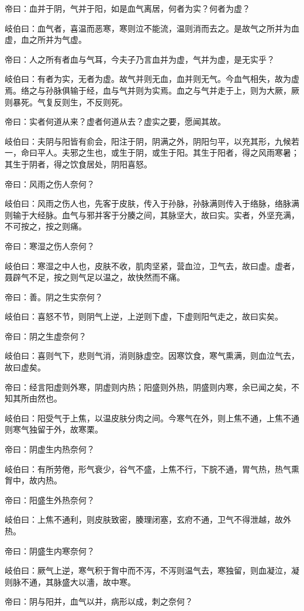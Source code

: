 \documentclass{article}%
\begin{document}
帝曰：血并于阴，气并于阳，如是血气离居，何者为实？何者为虚？

岐伯曰：血气者，喜温而恶寒，寒则泣不能流，温则消而去之。是故气之所并为血虚，血之所并为气虚。

帝曰：人之所有者血与气耳，今夫子乃言血并为虚，气并为虚，是无实乎？

岐伯曰：有者为实，无者为虚。故气并则无血，血并则无气。今血气相失，故为虚焉。络之与孙脉俱输于经，血与气并则为实焉。血之与气并走于上，则为大厥，厥则暴死。气复反则生，不反则死。

帝曰：实者何道从来？虚者何道从去？虚实之要，愿闻其故。

岐伯曰：夫阴与阳皆有俞会，阳注于阴，阴满之外，阴阳匀平，以充其形，九候若一，命曰平人。夫邪之生也，或生于阴，或生于阳。其生于阳者，得之风雨寒暑；其生于阴者，得之饮食居处，阴阳喜怒。

帝曰：风雨之伤人奈何？

岐伯曰：风雨之伤人也，先客于皮肤，传入于孙脉，孙脉满则传入于络脉，络脉满则输于大经脉。血气与邪并客于分腠之间，其脉坚大，故曰实。实者，外坚充满，不可按之，按之则痛。

帝曰：寒湿之伤人奈何？

岐伯曰：寒湿之中人也，皮肤不收，肌肉坚紧，营血泣，卫气去，故曰虚。虚者，聂辟气不足，按之则气足以温之，故快然而不痛。

帝曰：善。阴之生实奈何？

岐伯曰：喜怒不节，则阴气上逆，上逆则下虚，下虚则阳气走之，故曰实矣。

帝曰：阴之生虚奈何？

岐伯曰：喜则气下，悲则气消，消则脉虚空。因寒饮食，寒气熏满，则血泣气去，故曰虚矣。

帝曰：经言阳虚则外寒，阴虚则内热；阳盛则外热，阴盛则内寒，余已闻之矣，不知其所由然也。

岐伯曰：阳受气于上焦，以温皮肤分肉之间。今寒气在外，则上焦不通，上焦不通则寒气独留于外，故寒栗。

帝曰：阴虚生内热奈何？

岐伯曰：有所劳倦，形气衰少，谷气不盛，上焦不行，下脘不通，胃气热，热气熏胷中，故内热。

帝曰：阳盛生外热奈何？

岐伯曰：上焦不通利，则皮肤致密，腠理闭塞，玄府不通，卫气不得泄越，故外热。

帝曰：阴盛生内寒奈何？

岐伯曰：厥气上逆，寒气积于胷中而不泻，不泻则温气去，寒独留，则血凝泣，凝则脉不通，其脉盛大以濇，故中寒。

帝曰：阴与阳并，血气以并，病形以成，刺之奈何？
\end{document}
